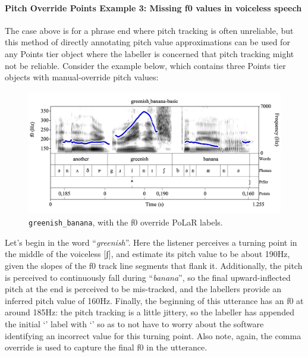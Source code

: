 \documentclass[11pt, twoside]{memoir}
\def\textlabel#1{{\relsize{-.5}\fontspec[Mapping=tex-text]{Roboto Mono}{#1}}}
\def\langtext#1{\textit{#1}}
\begin{document}
{{\paragraph{Pitch Override Points Example 3: Missing f0 values in voiceless speech\label{pitch-override-points-example-3}}
The case above is for a phrase end where pitch tracking is often unreliable, but this method of directly annotating pitch value approximations can be used for any Points tier object where the labeller is concerned that pitch tracking might not be reliable. Consider the example below, which contains three Points tier objects with manual-override pitch values:
\begin{figure}[H]
\centering
\includegraphics[width=.875\linewidth]{Points-greenish_banana-basic-comma.png}
\caption{\texttt{greenish\_banana}, with the f0 override PoLaR labels.
\label{fig:greenish banana Points comma}
}
\end{figure}
Let’s begin in the word “\langtext{greenish}”. Here the listener perceives a turning point in the middle of the voiceless [ʃ], and estimate its pitch value to be about 190Hz, given the slopes of the f0 track line segments that flank it. Additionally, the pitch is perceived to continuously fall during “\langtext{banana}”, so the final upward-inflected pitch at the end is perceived to be mis-tracked, and the labellers provide an inferred pitch value of 160Hz. Finally, the beginning of this utterance has an f0 at around 185Hz: the pitch tracking is a little jittery, so the labeller has appended the initial ‘\textlabel{0}’ label with ‘\textlabel{,185}’ so as to not have to worry about the software identifying an incorrect value for this turning point. Also note, again, the comma override is used to capture the final f0 in the utterance.
}}
\end{document}
